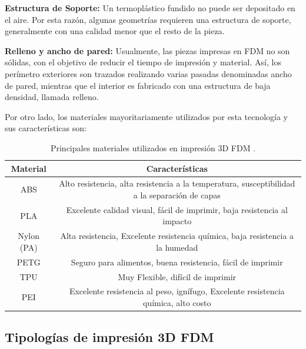 \begin{description}
\item \textbf{Estructura de Soporte:} Un termoplástico fundido no puede ser depositado en el aire. Por esta razón, algunas geometrías requieren una estructura de soporte, generalmente con una calidad menor que el resto de la pieza.
\end{description}

\begin{description}
\item \textbf{Relleno y ancho de pared:} Usualmente, las piezas impresas en FDM no son sólidas, con el objetivo de reducir el tiempo de impresión y material. Así, los perímetro exteriores son trazados realizando varias pasadas denominadas ancho de pared, mientras que el interior es fabricado con una estructura de baja densidad, llamada relleno.
\end{description}

Por otro lado, los materiales mayoritariamente utilizados por esta tecnología y sus características son: 

\begin{table}[H]
\centering
\begin{tabular}{|c|c|}
\hline
Material & Características \\
\hline
ABS & \parbox{25em}{Alto resistencia, alta resistencia a la temperatura, susceptibilidad a la separación de capas}\\
\hline
PLA & \parbox{25em}{Excelente calidad visual, fácil de imprimir, baja resistencia al impacto}\\
\hline
Nylon (PA) & \parbox{25em}{Alta resistencia, Excelente resistencia química, baja resistencia a la humedad}\\
\hline
PETG & \parbox{25em}{Seguro para alimentos, buena resistencia, fácil de imprimir}\\
\hline
TPU & \parbox{25em}{Muy Flexible, difícil de imprimir}\\
\hline
PEI & \parbox{25em}{Excelente resistencia al peso, ignífugo, Excelente resistencia química, alto costo}\\
\hline
\end{tabular}
\caption{Principales materiales utilizados en impresión 3D FDM \citep{bournias2017}.}
\end{table}

\subsection{Tipologías de impresión 3D FDM}

